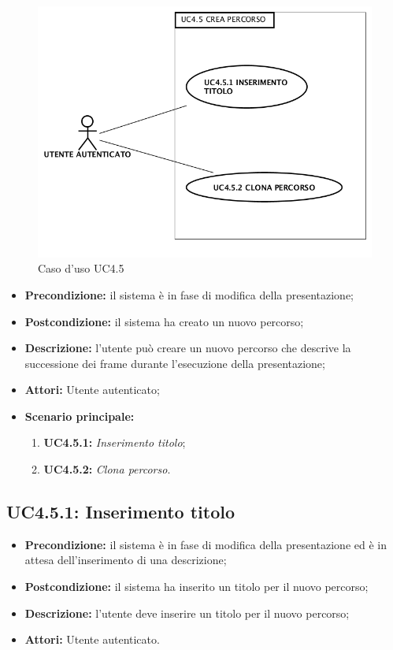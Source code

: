 \begin{figure}[h]
	\begin{center}
	\includegraphics[scale=0.4]{diagram/UC4-5.png}
	\caption{Caso d'uso UC4.5}
	\end{center}
\end{figure}
\begin{itemize}
	\item \textbf{Precondizione:} il sistema è in fase di modifica della presentazione;
	\item \textbf{Postcondizione:} il sistema ha creato un nuovo percorso;
	\item \textbf{Descrizione:} l'utente può creare un nuovo percorso che descrive la successione dei frame durante l'esecuzione della presentazione;
	\item \textbf{Attori:} Utente autenticato;
	\item \textbf{Scenario principale:}
	\begin{enumerate}
		\item \textbf{ UC4.5.1:} \textit{ Inserimento titolo};
		\item \textbf{ UC4.5.2:} \textit{ Clona percorso}.
	\end{enumerate}
\end{itemize}
\subsection{ UC4.5.1: Inserimento titolo}

\begin{itemize}
	\item \textbf{Precondizione:} il sistema è in fase di modifica della presentazione ed è in attesa dell'inserimento di una descrizione;
	\item \textbf{Postcondizione:} il sistema ha inserito un titolo per il nuovo percorso;
	\item \textbf{Descrizione:} l'utente deve inserire un titolo per il nuovo percorso;
	\item \textbf{Attori:} Utente autenticato.
\end{itemize}
